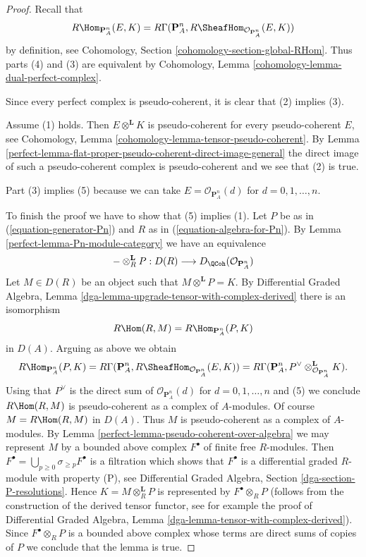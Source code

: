 \begin{proof}

Recall that
$$
R\Hom_{\mathbf{P}^n_A}(E, K) =
R\Gamma(\mathbf{P}^n_A, R\SheafHom_{\mathcal{O}_{\mathbf{P}^n_A}}(E, K))
$$
by definition, see Cohomology, Section \ref{cohomology-section-global-RHom}.
Thus parts (4) and (3) are equivalent by
Cohomology, Lemma \ref{cohomology-lemma-dual-perfect-complex}.

\medskip\noindent
Since every perfect complex is pseudo-coherent, it is clear that
(2) implies (3).

\medskip\noindent
Assume (1) holds. Then $E \otimes^\mathbf{L} K$ is pseudo-coherent
for every pseudo-coherent $E$, see
Cohomology, Lemma \ref{cohomology-lemma-tensor-pseudo-coherent}.
By Lemma \ref{perfect-lemma-flat-proper-pseudo-coherent-direct-image-general}
the direct image of such a pseudo-coherent complex is pseudo-coherent
and we see that (2) is true.

\medskip\noindent
Part (3) implies (5) because we can take $E = \mathcal{O}_{\mathbf{P}^n_A}(d)$
for $d = 0, 1, \ldots, n$.

\medskip\noindent
To finish the proof we have to show that (5) implies (1).
Let $P$ be as in (\ref{equation-generator-Pn}) and
$R$ as in (\ref{equation-algebra-for-Pn}).
By Lemma \ref{perfect-lemma-Pn-module-category} we have an equivalence
$$
- \otimes^\mathbf{L}_R P :
D(R) \longrightarrow D_\QCoh(\mathcal{O}_{\mathbf{P}^n_A})
$$
Let $M \in D(R)$ be an object such that $M \otimes^\mathbf{L} P = K$.
By Differential Graded Algebra, Lemma
\ref{dga-lemma-upgrade-tensor-with-complex-derived}
there is an isomorphism
$$
R\Hom(R, M) = R\Hom_{\mathbf{P}^n_A}(P, K)
$$
in $D(A)$. Arguing as above we obtain
$$
R\Hom_{\mathbf{P}^n_A}(P, K) = R\Gamma(\mathbf{P}^n_A,
R\SheafHom_{\mathcal{O}_{\mathbf{P}^n_A}}(E, K)) =
R\Gamma(\mathbf{P}^n_A,
P^\vee \otimes^\mathbf{L}_{\mathcal{O}_{\mathbf{P}^n_A}} K).
$$
Using that $P^\vee$ is the direct sum of
$\mathcal{O}_{\mathbf{P}^n_A}(d)$ for $d = 0, 1, \ldots, n$
and (5) we conclude $R\Hom(R, M)$ is pseudo-coherent as a complex
of $A$-modules. Of course $M = R\Hom(R, M)$ in $D(A)$.
Thus $M$ is pseudo-coherent as a complex of $A$-modules.
By Lemma \ref{perfect-lemma-pseudo-coherent-over-algebra}
we may represent $M$ by a bounded above complex $F^\bullet$
of finite free $R$-modules. Then
$F^\bullet = \bigcup_{p \geq 0} \sigma_{\geq p}F^\bullet$
is a filtration which shows that $F^\bullet$ is a differential
graded $R$-module with property (P), see
Differential Graded Algebra, Section \ref{dga-section-P-resolutions}.
Hence $K = M \otimes^\mathbf{L}_R P$ is represented
by $F^\bullet \otimes_R P$ (follows from the construction of the
derived tensor functor, see for example the proof of
Differential Graded Algebra, Lemma \ref{dga-lemma-tensor-with-complex-derived}).
Since $F^\bullet \otimes_R P$
is a bounded above complex whose terms are direct sums of
copies of $P$ we conclude that the lemma is true.
\end{proof}

